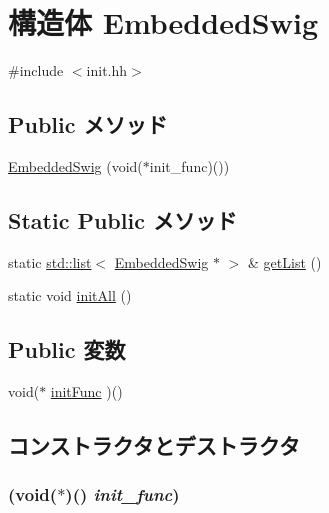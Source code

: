 \hypertarget{structEmbeddedSwig}{
\section{構造体 EmbeddedSwig}
\label{structEmbeddedSwig}
}


{\ttfamily \#include $<$init.hh$>$}\subsection*{Public メソッド}
\begin{DoxyCompactItemize}
\item 
\hyperlink{structEmbeddedSwig_ab6eedfa75d781191ac63d83acd1077d0}{EmbeddedSwig} (void($\ast$init\_\-func)())
\end{DoxyCompactItemize}
\subsection*{Static Public メソッド}
\begin{DoxyCompactItemize}
\item 
static \hyperlink{classstd_1_1list}{std::list}$<$ \hyperlink{structEmbeddedSwig}{EmbeddedSwig} $\ast$ $>$ \& \hyperlink{structEmbeddedSwig_ad2bcd7f5b4c3189310c7a8c36ab76e0f}{getList} ()
\item 
static void \hyperlink{structEmbeddedSwig_af92e16b8081e002c83c30ea3059bd9dc}{initAll} ()
\end{DoxyCompactItemize}
\subsection*{Public 変数}
\begin{DoxyCompactItemize}
\item 
void($\ast$ \hyperlink{structEmbeddedSwig_ad81d22e66fbb8a97010b1beea9745bd8}{initFunc} )()
\end{DoxyCompactItemize}


\subsection{コンストラクタとデストラクタ}
\hypertarget{structEmbeddedSwig_ab6eedfa75d781191ac63d83acd1077d0}{
\subsubsection[{EmbeddedSwig}]{ (void($\ast$)() {\em init\_\-func})}}
\label{structEmbeddedSwig_ab6eedfa75d781191ac63d83acd1077d0}



